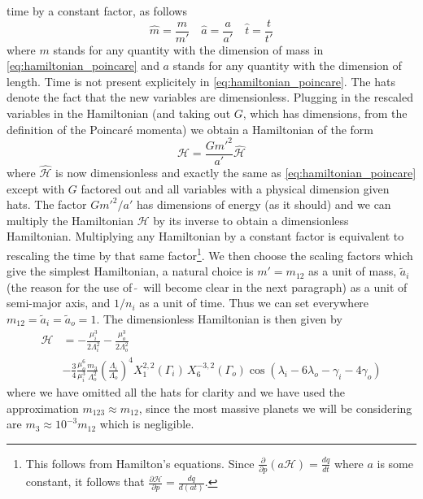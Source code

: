 \documentclass[ twoside,openright,titlepage,numbers=noenddot,headinclude,%
                footinclude=true,cleardoublepage=empty,abstractoff, %
                BCOR=5mm,paper=a4,fontsize=11pt,%
                american,%
                ]{scrreprt}
\begin{document}
time by a constant factor, as follows
\begin{equation}
    \hat m= \frac{m}{m'} \quad\hat a= \frac{a}{a'}\quad \hat t = \frac{t}{t'}  
\end{equation}
where $m$ stands for any quantity with the dimension of mass in 
\cref{eq:hamiltonian_poincare} and $a$ stands for any quantity with the 
dimension of length. Time is not present explicitely in \cref{eq:hamiltonian_poincare}.
The hats denote the fact that the new variables are dimensionless. Plugging in the
rescaled variables in the Hamiltonian (and taking out $G$, which has dimensions, from
the definition of the Poincaré momenta) we obtain a Hamiltonian of the form
\begin{equation}
    \mathcal{H}= \frac{Gm'^2}{a'} \mathcal{\hat H}
\end{equation}
where $\mathcal{\hat H}$ is now dimensionless and exactly the same as
\cref{eq:hamiltonian_poincare} except with $G$ factored out and all 
variables with a physical dimension given hats. The factor $Gm'^2/a'$ 
has dimensions of energy (as it should) and we can multiply the 
Hamiltonian $\mathcal{H}$ by its inverse to obtain a dimensionless 
Hamiltonian. Multiplying any Hamiltonian by a constant factor is 
equivalent to rescaling the time by that same factor\footnote{
    This follows from Hamilton's equations. Since 
    $\frac{\partial}{\partial p} (a
    \mathcal{H})= \frac{dq}{dt}$ where $a$ is some 
    constant, it follows that
$ \frac{\partial\mathcal{H}}{\partial p} = \frac{dq}{d(at)}$.}.
We then choose the scaling factors which give the simplest Hamiltonian,
a natural choice is $m'=m_{12}$ as a unit of mass, $\tilde{a}_i$ (the
reason for the use
of $\,\tilde{}\,$ will become clear in the next paragraph) as a unit of 
semi-major axis, and $1/n_i$ as a unit of time. Thus we can set
everywhere $m_{12}=\tilde{a}_i=\tilde{a}_o=1$. The dimensionless
Hamiltonian is then given by
\begin{equation}
    \begin{aligned}
        \mathcal{H}&=-\frac{\mu_i^3}{2\Lambda_i^2}  
        -\frac{\mu_o^3}{2\Lambda_o^2}\\ 
        &-\frac{3}{4} \frac{\mu_o^6}{\mu_i^3} 
       \frac{m_3}{\Lambda_o^2} \left(\frac{\Lambda_i}{\Lambda_o}\right)^4
    X^{2,2}_1(\Gamma_i)\,X^{-3,2}_6(\Gamma_o)\cos(\lambda_i-6\lambda_o
    -\gamma_i - 4\gamma_o)
    \end{aligned}
    \label{eq:hamiltonian_poincare_dimensionless}
\end{equation}
where we have omitted all the hats for clarity and we have used the 
approximation $m_{123}\approx m_{12}$, since the most massive planets
we will be considering are $m_3\approx 10^{-3} m_{12}$ which is negligible.
\end{document}
